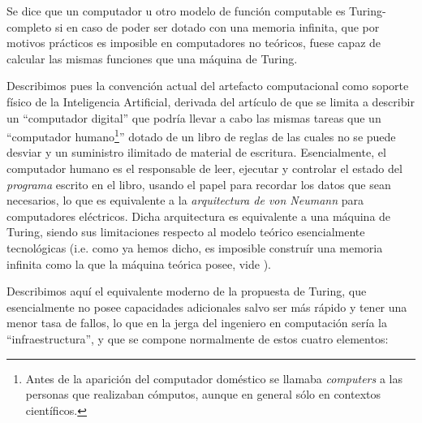 \documentclass[12pt]{memoir}
\begin{document}
Se dice que un computador u otro modelo de función computable es Turing-completo si en caso de poder ser dotado con una memoria infinita, que por motivos prácticos es imposible en computadores no teóricos, fuese capaz de calcular las mismas funciones que una máquina de Turing.

Describimos pues la convención actual del artefacto computacional como soporte físico de la Inteligencia Artificial, derivada del artículo de \cite[apartados 4 y 5]{Turing1950cmi} que se limita a describir un ``computador digital'' que podría llevar a cabo las mismas tareas que un ``computador humano\footnote{Antes de la aparición del computador doméstico se llamaba \textit{computers} a las personas que realizaban cómputos, aunque en general sólo en contextos científicos.}'' dotado de un libro de reglas de las cuales no se puede desviar y un suministro ilimitado de material de escritura. Esencialmente, el computador humano es el responsable de leer, ejecutar y controlar el estado del \textit{programa} escrito en el libro, usando el papel para recordar los datos que sean necesarios, lo que es equivalente a la \textit{arquitectura de von Neumann} para computadores eléctricos. Dicha arquitectura es equivalente a una máquina de Turing, siendo sus limitaciones respecto al modelo teórico esencialmente tecnológicas (i.e. como ya hemos dicho, es imposible construír una memoria infinita como la que la máquina teórica posee, vide \cite[apartado 4]{Turing1950cmi}).

Describimos aquí el equivalente moderno de la propuesta de Turing, que esencialmente no posee capacidades adicionales salvo ser más rápido y tener una menor tasa de fallos, lo que en la jerga del ingeniero en computación sería la ``infraestructura'', y que se compone normalmente de estos cuatro elementos:
\end{document}

